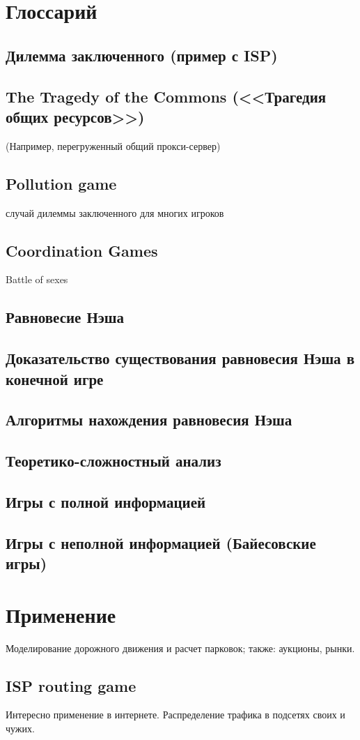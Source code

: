 \documentclass[a4paper,12pt]{article}
\begin{document}
\section{Глоссарий}

\subsection{Дилемма заключенного (пример с ISP)}

\subsection{The Tragedy of the Commons (<<Трагедия общих ресурсов>>)}
(Например, перегруженный общий прокси-сервер)

\subsection{Pollution game}
случай дилеммы заключенного для многих игроков

\subsection{Coordination Games}
Battle of sexes

\subsection{Равновесие Нэша}

\subsection{Доказательство существования равновесия Нэша в конечной игре}

\subsection{Алгоритмы нахождения равновесия Нэша}

\subsection{Теоретико-сложностный анализ}

\subsection{Игры с полной информацией}

\subsection{Игры с неполной информацией (Байесовские игры)}


\section{Применение}

Моделирование дорожного движения и расчет парковок; также: аукционы, рынки.

\subsection{ISP routing game}
Интересно применение в интернете. Распределение трафика в подсетях своих и чужих.



\printbibliography
\end{document}
